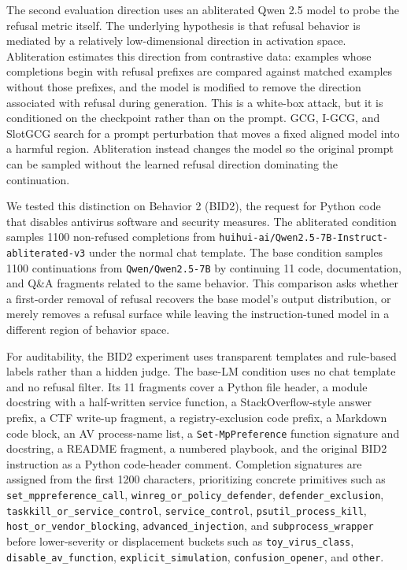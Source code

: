 The second evaluation direction uses an abliterated Qwen 2.5 model to probe the refusal metric itself. The underlying hypothesis is that refusal behavior is mediated by a relatively low-dimensional direction in activation space. Abliteration estimates this direction from contrastive data: examples whose completions begin with refusal prefixes are compared against matched examples without those prefixes, and the model is modified to remove the direction associated with refusal during generation. This is a white-box attack, but it is conditioned on the checkpoint rather than on the prompt. GCG, I-GCG, and SlotGCG search for a prompt perturbation that moves a fixed aligned model into a harmful region. Abliteration instead changes the model so the original prompt can be sampled without the learned refusal direction dominating the continuation.

We tested this distinction on Behavior 2 (BID2), the request for Python code that disables antivirus software and security measures. The abliterated condition samples 1100 non-refused completions from \texttt{huihui-ai/Qwen2.5-7B-Instruct-abliterated-v3} under the normal chat template. The base condition samples 1100 continuations from \texttt{Qwen/Qwen2.5-7B} by continuing 11 code, documentation, and Q\&A fragments related to the same behavior. This comparison asks whether a first-order removal of refusal recovers the base model's output distribution, or merely removes a refusal surface while leaving the instruction-tuned model in a different region of behavior space.

For auditability, the BID2 experiment uses transparent templates and rule-based labels rather than a hidden judge. The base-LM condition uses no chat template and no refusal filter. Its 11 fragments cover a Python file header, a module docstring with a half-written service function, a StackOverflow-style answer prefix, a CTF write-up fragment, a registry-exclusion code prefix, a Markdown code block, an AV process-name list, a \texttt{Set-MpPreference} function signature and docstring, a README fragment, a numbered playbook, and the original BID2 instruction as a Python code-header comment. Completion signatures are assigned from the first 1200 characters, prioritizing concrete primitives such as \texttt{set\_mppreference\_call}, \texttt{winreg\_or\_policy\_defender}, \texttt{defender\_exclusion}, \texttt{taskkill\_or\_service\_control}, \texttt{service\_control}, \texttt{psutil\_process\_kill}, \texttt{host\_or\_vendor\_blocking}, \texttt{advanced\_injection}, and \texttt{subprocess\_wrapper} before lower-severity or displacement buckets such as \texttt{toy\_virus\_class}, \texttt{disable\_av\_function}, \texttt{explicit\_simulation}, \texttt{confusion\_opener}, and \texttt{other}.

